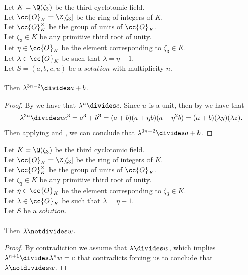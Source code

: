 \begin{lemma}
  \label{lmm:lambda_pow_dvd_a_add_b}
  \leanok
  Let $K = \Q(\zeta_3)$ be the third cyclotomic field. \\
  Let $\cc{O}_K = \Z[\zeta_3]$ be the ring of integers of $K$. \\
  Let $\cc{O}^\times_K$ be the group of units of $\cc{O}_K$. \\
  Let $\zeta_3 \in K$ be any primitive third root of unity. \\
  Let $\eta \in \cc{O}_K$ be the element corresponding to $\zeta_3 \in K$. \\
  Let $\lambda \in \cc{O}_K$ be such that $\lambda = \eta -1$. \\
  Let $S=(a, b, c, u)$ be a $solution$ with multiplicity $n$.\\\\
  Then $\lambda^{3n -2} \divides a + b$.
\end{lemma}
\begin{proof}
  \leanok
  By  we have that $\lambda^n \divides c$.
  Since $u$ is a unit, then by  we have that
  $$\lambda^{3n} \divides u  c^3 = a^3 + b^3 = (a+b)(a + \eta b)(a + \eta^2 b)
  = (a+b)(\lambda y)(\lambda z).$$
  Then applying  and , we can conclude
  that $\lambda^{3n-2} \divides a+b$.
\end{proof}

\begin{lemma}
  \label{lmm:lambda_not_dvd_w}
  \leanok
  Let $K = \Q(\zeta_3)$ be the third cyclotomic field. \\
  Let $\cc{O}_K = \Z[\zeta_3]$ be the ring of integers of $K$. \\
  Let $\cc{O}^\times_K$ be the group of units of $\cc{O}_K$. \\
  Let $\zeta_3 \in K$ be any primitive third root of unity. \\
  Let $\eta \in \cc{O}_K$ be the element corresponding to $\zeta_3 \in K$. \\
  Let $\lambda \in \cc{O}_K$ be such that $\lambda = \eta -1$. \\
  Let $S$ be a $solution$.\\\\
  Then $\lambda \notdivides w$.
\end{lemma}
\begin{proof}
  \leanok
  By contradiction we assume that $\lambda \divides w$, which implies
  $\lambda^{n+1} \divides \lambda^n  w = c$ that contradicts 
  forcing us to conclude that $\lambda \notdivides w$.
\end{proof}

